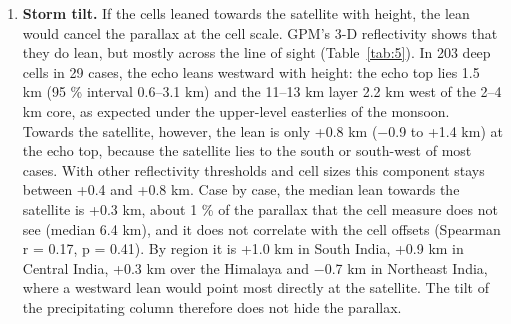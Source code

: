 \begin{enumerate}
  The GPM-fitted navigation centres the cell measure (−0.5 km) but pushes the field measure to +4.9 km and makes it worse than uncorrected (Table~\ref{tab:3}, Fig.~\ref{fig:4}):

  \begin{itemize}
  \tightlist
  \item
    median absolute offset 6.0 km;
  \item
    10 of 31 cases better than raw;
  \item
    Wilcoxon p = 0.027, sign test p = 0.07; against parallax only, p = 0.28.
  \end{itemize}

  \textbf{No single translation centres both measures.} The field and cell measures differ by 2--3 km in the raw and coastline-navigation states, and by about 5 km once the navigation is fitted to the cells. Navigation alone therefore cannot explain the result: the two measures see different parts of the storm (below). The east component of the fitted value also disagrees with ISRO's reports, which point west.
\item
  \textbf{Storm tilt.} If the cells leaned towards the satellite with height, the lean would cancel the parallax at the cell scale. GPM's 3-D reflectivity shows that they do lean, but mostly across the line of sight (Table~\ref{tab:5}). In 203 deep cells in 29 cases, the echo leans westward with height: the echo top lies 1.5 km (95 \% interval 0.6--3.1 km) and the 11--13 km layer 2.2 km west of the 2--4 km core, as expected under the upper-level easterlies of the monsoon. Towards the satellite, however, the lean is only +0.8 km (−0.9 to +1.4 km) at the echo top, because the satellite lies to the south or south-west of most cases. With other reflectivity thresholds and cell sizes this component stays between +0.4 and +0.8 km. Case by case, the median lean towards the satellite is +0.3 km, about 1 \% of the parallax that the cell measure does not see (median 6.4 km), and it does not correlate with the cell offsets (Spearman r = 0.17, p = 0.41). By region it is +1.0 km in South India, +0.9 km in Central India, +0.3 km over the Himalaya and −0.7 km in Northeast India, where a westward lean would point most directly at the satellite. The tilt of the precipitating column therefore does not hide the parallax.
\end{enumerate}

